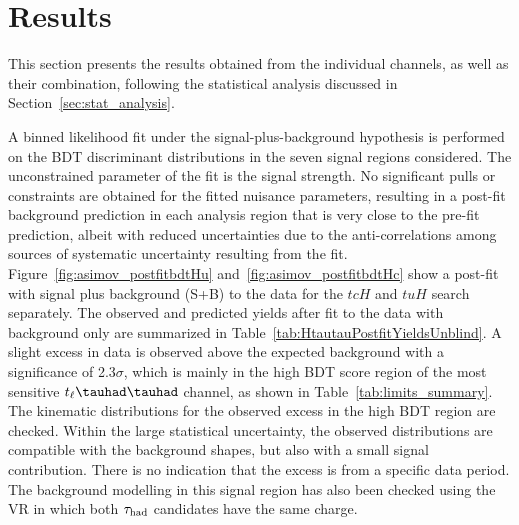 \section{Results}
\label{sec:result}

This section presents the results obtained from the individual channels, as well as their combination,
following the statistical analysis discussed in Section~\ref{sec:stat_analysis}.

A binned likelihood fit under the signal-plus-background hypothesis is performed on the BDT discriminant distributions in the seven 
signal regions considered. The unconstrained parameter of the fit is the signal strength.
No significant pulls or constraints are obtained for the fitted nuisance parameters, resulting in a post-fit background prediction in each analysis region that is
very close to the pre-fit prediction, albeit with reduced uncertainties due to the anti-correlations among sources of systematic uncertainty resulting from the fit.
Figure~\ref{fig:asimov_postfitbdtHu} and~\ref{fig:asimov_postfitbdtHc} show a post-fit with signal plus background (S+B) to the data for
the $tcH$ and $tuH$ search separately.
The observed and predicted yields after fit to the data with background only are summarized in Table~\ref{tab:HtautauPostfitYieldsUnblind}.
A slight excess in data is observed above the expected background with a significance of 2.3$\sigma$, which is mainly in the high BDT score region of the most sensitive $t_{\ell}\thadhad$ channel, as shown in
Table~\ref{tab:limits_summary}.
The kinematic distributions for the observed excess in
the high BDT region are checked. Within the large statistical uncertainty, the observed distributions are compatible with the background shapes, but also with a small signal contribution. There is no indication that the excess is from a specific data period.
The background modelling in this signal region has also been checked using the VR in which both $\tau_\text{had}$ candidates have the same charge.
